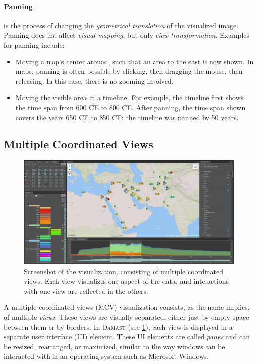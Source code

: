 \paragraph{Panning} is the process of changing the \emph{geometrical translation} of the visualized image.
Panning does not affect \emph{visual mapping}, but only \emph{view transformation}.
Examples for panning include:

\begin{itemize}
  \item
    Moving a map's center around, such that an area to the east is now shown.
    In maps, panning is often possible by clicking, then dragging the mouse, then releasing.
    In this case, there is no zooming involved.
  \item
    Moving the visible area in a timeline.
    For example, the timeline first shows the time span from 600 CE to 800 CE.
    After panning, the time span shown covers the years 650 CE to 850 CE;
    the timeline was panned by 50 years.
\end{itemize}

\subsection{Multiple Coordinated Views}
\label{sec:terminology-mcv}

\begin{figure}[tb]
  \centering
  \includegraphics[width=\textwidth]{../src/assets/visualization-documentation/full-vis-screenshot.png}
  \caption{
    Screenshot of the visualization, consisting of multiple coordinated views.
    Each view visualizes one aspect of the data, and interactions with one view are reflected in the others.
  }
  \label{fig:full-vis-screenshot}
\end{figure}

A multiple coordinated views (MCV) visualization consists, as the name implies, of multiple \emph{views.}
These views are visually separated, either just by empty space between them or by borders.
In \textsc{Damast} (see \cref{fig:full-vis-screenshot}), each view is displayed in a separate user interface (UI) element.
These UI elements are called \emph{panes} and can be resized, rearranged, or maximized, similar to the way windows can be interacted with in an operating system such as Microsoft Windows.


